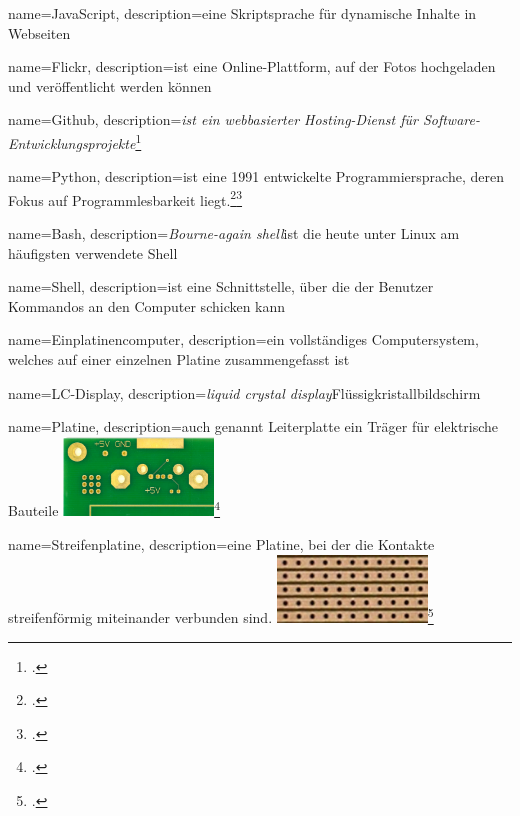 
{
  name=JavaScript,
  description={eine Skriptsprache für dynamische Inhalte in Webseiten}
}

{
  name=Flickr,
  description={ist eine Online-Plattform, auf der Fotos hochgeladen und veröffentlicht werden können}
}

{
  name=Github,
  description={\emph{ist ein webbasierter Hosting-Dienst für Software-Entwicklungsprojekte}\footcite{wiki:github}}
}

{
  name=Python,
  description={ist eine 1991 entwickelte Programmiersprache, deren Fokus auf Programmlesbarkeit liegt.\footcite{python}\footcite{python_manual}{}}
}

{
  name=Bash,
  description={\textit{Bourne-again shell}\newline ist die heute unter Linux am häufigsten verwendete \gls{Shell}}
}

{
  name=Shell,
  description={ist eine Schnittstelle, über die der Benutzer Kommandos an den Computer schicken kann}
}

{
  name=Einplatinencomputer,
  description={ein vollständiges Computersystem, welches auf einer einzelnen Platine zusammengefasst ist}
}

{
  name=LC-Display,
  description={\emph{liquid crystal display}\newline Flüssigkristallbildschirm}
}

{
  name=Platine,
  description={auch genannt Leiterplatte\newline
  ein Träger für elektrische Bauteile\newline
  \includegraphics[width=4cm]{figures/platine.png}\footcite{platine}
    	}
}

{
  name=Streifenplatine,
  description={eine \gls{Platine}, bei der die Kontakte streifenförmig miteinander verbunden sind.\newline
  \includegraphics[width=4cm]{figures/streifenplatine.png}\footcite{streifenplatine}
  	}
}

